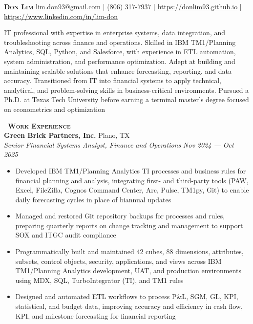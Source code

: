 \documentclass[a4paper,11pt]{article}
\newcommand{\header} [1] {
    \vspace{0.5mm}
    {\textsc{\textbf{\Large{\xrfill[0.5ex]{0.5pt}~#1~\xrfill[0.5ex]{0.5pt}}}}} %
}
\begin{document}
\vspace*{-0.45in}
\fontsize{10.5}{11.5}\selectfont

\begin{raggedright}
    {\Huge\textbf\textsc{{{Don Lim}}}} \hfill
    \href{mailto:lim.don93@gmail.com}{lim.don93@gmail.com} | (806) 317-7937 | \href{https://donlim93.github.io/}{https://donlim93.github.io} | \href{https://www.linkedin.com/in/lim-don/}{https://www.linkedin.com/in/lim-don} \\ \vspace{2mm}
\end{raggedright}

IT professional with expertise in enterprise systems, data integration, and troubleshooting across finance and operations. Skilled in IBM TM1/Planning Analytics, SQL, Python, and Salesforce, with experience in ETL automation, system administration, and performance optimization. Adept at building and maintaining scalable solutions that enhance forecasting, reporting, and data accuracy. Transitioned from IT into financial systems to apply technical, analytical, and problem-solving skills in business-critical environments. Pursued a Ph.D. at Texas Tech University before earning a terminal master’s degree focused on econometrics and optimization \\
\vspace{0.5mm}

\header{Work Experience} \\
\vspace{0.5mm}
\textbf{Green Brick Partners, Inc.} \hfill Plano, TX \\
\textit{Senior Financial Systems Analyst, Finance and Operations} \hfill \textit{Nov 2024 --- Oct 2025} \\
\begin{itemize}
    \item Developed IBM TM1/Planning Analytics TI processes and business rules for financial planning and analysis, integrating first- and third-party tools (PAW, Excel, FileZilla, Cognos Command Center, Arc, Pulse, TM1py, Git) to enable daily forecasting cycles in place of biannual updates  
    \item Managed and restored Git repository backups for processes and rules, preparing quarterly reports on change tracking and management to support SOX and ITGC audit compliance  
    \item Programmatically built and maintained 42 cubes, 88 dimensions, attributes, subsets, control objects, security, applications, and views across IBM TM1/Planning Analytics development, UAT, and production environments using MDX, SQL, TurboIntegrator (TI), and TM1 rules  
    \item Designed and automated ETL workflows to process P\&L, SGM, GL, KPI, statistical, and budget data, improving accuracy and efficiency in cash flow, KPI, and milestone forecasting for financial reporting  
\end{itemize}
\vspace{0.5mm}
\end{document}
